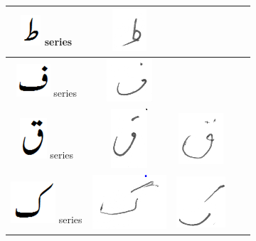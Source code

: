 \documentclass[a4paper,conference]{IEEEtran}
\begin{document}
\begin{table}[h]
\begin{tabular}{@{}ccccc@{}}
\hline
\includegraphics[scale=0.15]{tuay_orig} series & \includegraphics[scale=0.15]{60} &  & & \\
\hline
\includegraphics[scale=0.25]{fay_orig} series & \includegraphics[scale=0.20]{61} & & & \\
\hline
\includegraphics[scale=0.20]{qaaf_orig} series & \includegraphics[scale=0.15]{62} & 
\includegraphics[scale=0.15]{63} &  & \\
\hline
\includegraphics[scale=0.15]{kaaf_orig} series & \includegraphics[scale=0.15]{64} & \includegraphics[scale=0.15]{65}  & 

\end{tabular}
\end{table}
\end{document}
